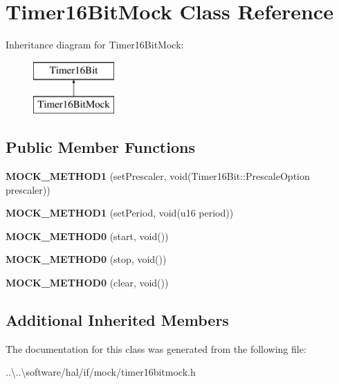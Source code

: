 \hypertarget{class_timer16_bit_mock}{}\section{Timer16\+Bit\+Mock Class Reference}
\label{class_timer16_bit_mock}
Inheritance diagram for Timer16\+Bit\+Mock\+:\begin{figure}[H]
\begin{center}
\leavevmode
\includegraphics[height=2.000000cm]{class_timer16_bit_mock}
\end{center}
\end{figure}
\subsection*{Public Member Functions}
\begin{DoxyCompactItemize}
\item 
\mbox{\label{class_timer16_bit_mock_a8272ab29daf94144c15f64c785e9026c}} 
{\bfseries M\+O\+C\+K\+\_\+\+M\+E\+T\+H\+O\+D1} (set\+Prescaler, void(Timer16\+Bit\+::\+Prescale\+Option prescaler))
\item 
\mbox{\label{class_timer16_bit_mock_a0a9dcbb8771b9f12575805ed70e8ae98}} 
{\bfseries M\+O\+C\+K\+\_\+\+M\+E\+T\+H\+O\+D1} (set\+Period, void(u16 period))
\item 
\mbox{\label{class_timer16_bit_mock_a574476d845314c4d19383c824a49b328}} 
{\bfseries M\+O\+C\+K\+\_\+\+M\+E\+T\+H\+O\+D0} (start, void())
\item 
\mbox{\label{class_timer16_bit_mock_a8a66e1fe5e8897588b5490c847251e95}} 
{\bfseries M\+O\+C\+K\+\_\+\+M\+E\+T\+H\+O\+D0} (stop, void())
\item 
\mbox{\label{class_timer16_bit_mock_aac6363ec6022b18cc5a612b56ef3573c}} 
{\bfseries M\+O\+C\+K\+\_\+\+M\+E\+T\+H\+O\+D0} (clear, void())
\end{DoxyCompactItemize}
\subsection*{Additional Inherited Members}


The documentation for this class was generated from the following file\+:\begin{DoxyCompactItemize}
\item 
..\textbackslash{}..\textbackslash{}software/hal/if/mock/timer16bitmock.\+h\end{DoxyCompactItemize}
